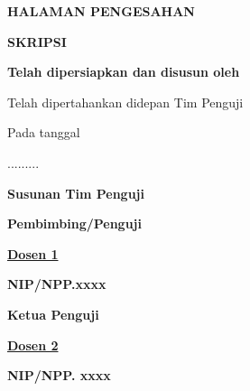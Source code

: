  {}

%

\begin{center}
	{\Large \textbf{HALAMAN PENGESAHAN} }
	
	\vspace{\baselineskip}
	
	{\Large \textbf{SKRIPSI} }
	
	\vspace{\baselineskip}
	
	{\Large \textbf{\judulindo} }
	
	\vspace{\baselineskip}
	
	\textbf{Telah dipersiapkan dan disusun oleh}
	
	\vspace{\baselineskip}
    \textbf{\nama}
	
	\textbf{\nim}
	
	\vspace{\baselineskip}
	
	Telah dipertahankan didepan Tim Penguji
	
	Pada tanggal
	
	.........
	
	\vspace{\baselineskip}
	
	\textbf{Susunan Tim Penguji}
	
	\vspace{1\baselineskip}
	\noindent\hspace*{-1cm}%
	\begin{minipage}{\dimexpr0.6\textwidth+1cm}
		\textbf{Pembimbing/Penguji}
		
		\vspace{3\baselineskip}
		
		{\textbf{\underline{Dosen 1}}}
		
		\textbf{NIP/NPP.xxxx}
	\end{minipage}%
	\begin{minipage}{\dimexpr0.5\textwidth}
		\textbf{Ketua Penguji}
		
		\vspace{3\baselineskip}
		
		{\textbf{\underline{Dosen 2}}}
		
		\textbf{NIP/NPP. xxxx}
	\end{minipage}
	

\end{center}
